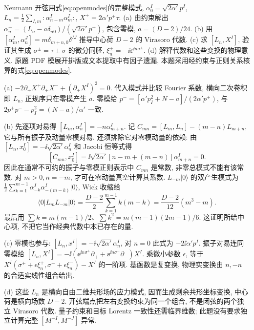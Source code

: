 \begin{exercise}
Neumann 开弦用式\eqref{eq:openmodes}的完整模式, $\alpha_0^I=\sqrt{2\alpha'}p^I$, $L_n=\frac12\sum_{I,m}:\alpha_{n-m}^I\alpha_m^I:$, $X^+=2\alpha'p^+\tau$.
(a) 由约束解出 $\alpha_n^-=(L_n-a\delta_{n0})/(\sqrt{2\alpha'}p^+)$, 包含零模, $a=(D-2)/24$.
(b) 用 $[\alpha_m^I,\alpha_n^J]=m\delta_{m+n,0}\delta^{IJ}$ 推导中心荷 $D-2$ 的 Virasoro 代数.
(c) 求 $[L_n,X^I]$, 验证其生成 $\sigma^\pm=\tau\pm\sigma$ 的微分同胚, $\xi_n^\pm=-\ii\ee^{\ii n\sigma^\pm}$.
(d) 解释代数和这些变换的物理意义. 原题 PDF 模展开排版或文本提取中有因子遗漏, 本题采用经约束与正则关系核算的式\eqref{eq:openmodes}.
\end{exercise}
\begin{solution}
(a) $-2\partial_\pm X^+\partial_\pm X^-+(\partial_\pm X^I)^2=0$. 代入模式并比较 Fourier 系数, 横向二次卷积即 $L_n$, 正规序只在零模产生 $a$. 零模给 $p^-=[\alpha'p_I^2+N-a]/(2\alpha'p^+)$, 与 $2p^+p^--p_I^2=(N-a)/\alpha'$ 一致.

(b) 先逐项对易得 $[L_m,\alpha_n^I]=-n\alpha_{m+n}^I$. 记 $C_{mn}=[L_m,L_n]-(m-n)L_{m+n}$, 它与所有振子及动量零模对易. 还须排除它对零模动量的依赖: 由 $[L_n,x_0^I]=-\ii\sqrt{2\alpha'}\alpha_n^I$ 和 Jacobi 恒等式得
\[
[C_{mn},x_0^I]=\ii\sqrt{2\alpha'}[n-m+(m-n)]\alpha_{m+n}^I=0.
\]
因此在通常不可约的振子与零模正则表示中 $C_{mn}$ 是常数, 非零总模式不能有该常数. 对 $m>0,n=-m$, 才可在零动量真空计算其系数. $L_{-m}|0\rangle$ 的双产生模式为 $\frac12\sum_{k=1}^{m-1}\alpha_{-k}^I\alpha_{-(m-k)}^I|0\rangle$, Wick 收缩给
\[
\langle0|L_mL_{-m}|0\rangle=
\frac{D-2}2\sum_{k=1}^{m-1}k(m-k)
=\frac{D-2}{12}(m^3-m).
\]
最后用 $\sum k=m(m-1)/2$、$\sum k^2=m(m-1)(2m-1)/6$. 这证明所给中心项, 不把它当作经典代数中本已存在的量.

(c) 零模也参与: $[L_n,x^I]=-\ii\sqrt{2\alpha'}\alpha_n^I$, 对 $n=0$ 此式为 $-2\ii\alpha'p^I$. 振子对易连同零模给
$[L_n,X^I]=-\ii(\ee^{\ii n\sigma^+}\partial_++\ee^{\ii n\sigma^-}\partial_-)X^I$.
乘微小参数 $\epsilon$, 等于 $X^I(\sigma^++\epsilon\xi_n^+,\sigma^-+\epsilon\xi_n^-)-X^I$ 的一阶项. 基函数是复变换, 物理实变换由 $n,-n$ 的合适实线性组合给出.

(d) 这些 $L_n$ 是横向自由二维共形场的应力模式, 因而生成剩余共形坐标变换, 中心荷是横向场数 $D-2$. 开弦端点把左右变换约束为同一个组合, 不是闭弦的两个独立 Virasoro 代数. 量子约束和目标 Lorentz 一致性还需临界维数; 此题没有要求独立计算完整 $[M^{-I},M^{-J}]$ 异常.
\end{solution}

